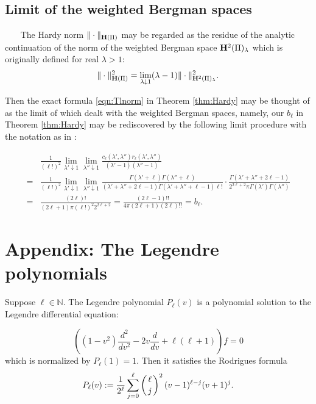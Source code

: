 \documentclass[12pt,leqno]{amsart}
\theoremstyle{plain}
\theoremstyle{definition}
\begin{document}
\subsection{Limit of the weighted Bergman spaces}
~~~
\newline
The Hardy norm 
 $\|\cdot\|_{{\bf{H}}(\Pi)}$ may be regarded
 as the residue
 of the analytic continuation
 of the norm
 of the weighted Bergman space
 ${\bf{H}}^2(\Pi)_{\lambda}$
 which is originally defined 
 for real $\lambda>1$:
\[
   \|\cdot\|_{{\bf{H}}(\Pi)}^2
   =\lim_{\lambda \downarrow 1}
    (\lambda-1)
    \|\cdot\|_{{\bf{H}}^2(\Pi)_{\lambda}}^2.  
\]



Then the exact formula \eqref{eqn:Tlnorm} in Theorem \ref{thm:Hardy} 
 may be thought
 of as the limit of \cite[Thm.\ 2.7]{KP20}
 which dealt with the weighted Bergman spaces, 
 namely, 
 our $b_{\ell}$ in Theorem \ref{thm:Hardy}
 may be rediscovered by the following limit procedure
 with the notation 
 as in \cite[(2.3) and (2.4)]{KP20}:



\begin{align*}
& \frac {1}{(\ell !)^2} \lim_{\lambda' \downarrow 1}\lim_{\lambda'' \downarrow 1}
\frac{c_{\ell}(\lambda',\lambda'')r_{\ell}(\lambda',\lambda'')}{(\lambda'-1)(\lambda''-1)}
\\
=& \frac {1}{(\ell !)^2}
\lim_{\lambda' \downarrow 1}\lim_{\lambda'' \downarrow 1}
\frac{\Gamma(\lambda'+\ell) \Gamma(\lambda''+\ell)}{(\lambda'+\lambda''+2\ell-1)\Gamma(\lambda'+\lambda''+\ell-1)\ell!} 
\cdot
\frac{\Gamma(\lambda'+\lambda''+2\ell-1)}
{2^{2\ell+2} \pi \Gamma(\lambda')\Gamma(\lambda'')}
\\
=& \frac{(2\ell)!}{(2\ell+1)\pi(\ell !)^2 2^{2\ell+2}}
=\frac{(2\ell-1)!!}{4 \pi(2\ell+1) (2\ell)!!}
=b_{\ell}.  
\end{align*}



\section{Appendix: The Legendre polynomials}
\label{sec:appendix}
Suppose $\ell \in {\mathbb{N}}$.  
The Legendre polynomial $P_{\ell}(v)$ is a polynomial solution
 to the  Legendre differential equation:

\[
((1-v^2)\frac{d^2}{dv^2}-2v\frac{d}{dv}+\ell(\ell+1))f=0
\]
 which is normalized by 
$
  P_{\ell}(1)=1.  
$
Then it satisfies the Rodrigues formula
\begin{equation}
\label{eqn:Pl}
  P_{\ell}(v):=
  \frac 1 {2^{\ell}} \sum_{j=0}^{\ell} 
  \left(\ell \atop j\right)^2(v-1)^{\ell-j} (v+1)^j.  
\end{equation}
\end{document}
